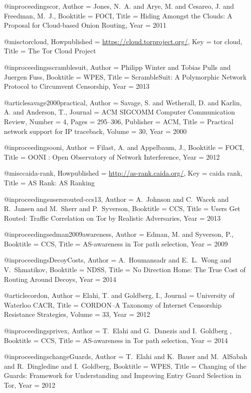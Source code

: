 {{{{{{{{{@inproceedings{cor,
	Author = {Jones, N.~A. and Arye, M. and Cesareo, J. and Freedman, M.~J.},
	Booktitle = {FOCI},
	Title = {{Hiding Amongst the Clouds: A Proposal for Cloud-based Onion Routing}},
	Year = {2011}}

@misc{torcloud,
	Howpublished = {\url{https://cloud.torproject.org/}},
	Key = {tor cloud},
	Title = {{The Tor Cloud Project}}}

@inproceedings{scramblesuit,
	Author = {Philipp Winter and Tobias Pulls and Juergen Fuss},
	Booktitle = {WPES},
	Title = {{ScrambleSuit: A Polymorphic Network Protocol to Circumvent Censorship}},
	Year = 2013}

@article{savage2000practical,
	Author = {Savage, S. and Wetherall, D. and Karlin, A. and Anderson, T.},
	Journal = {ACM SIGCOMM Computer Communication Review},
	Number = {4},
	Pages = {295--306},
	Publisher = {ACM},
	Title = {Practical network support for IP traceback},
	Volume = {30},
	Year = {2000}}

@inproceedings{ooni,
	Author = {Filast, A. and Appelbaum, J.},
	Booktitle = {{FOCI}},
	Title = {{OONI : Open Observatory of Network Interference}},
	Year = {2012}}

@misc{caida-rank,
	Howpublished = {\url{http://as-rank.caida.org/}},
	Key = {caida rank},
	Title = {{AS Rank: AS Ranking}}}

@inproceedings{usersrouted-ccs13,
	Author = {A.~Johnson and C.~Wacek and R.~Jansen and M.~Sherr and P.~Syverson},
	Booktitle = {CCS},
	Title = {{Users Get Routed: Traffic Correlation on Tor by Realistic Adversaries}},
	Year = {2013}}

@inproceedings{edman2009awareness,
	Author = {Edman, M. and Syverson, P.},
	Booktitle = {{CCS}},
	Title = {{AS-awareness in Tor path selection}},
	Year = {2009}}

@inproceedings{DecoyCosts,
	Author = {A.~Houmansadr and E.~L.~Wong and V.~Shmatikov},
	Booktitle = {NDSS},
	Title = {{No Direction Home: The True Cost of Routing Around Decoys}},
	Year = {2014}}

@article{cordon,
	Author = {Elahi, T. and Goldberg, I.},
	Journal = {University of Waterloo CACR},
	Title = {{CORDON--A Taxonomy of Internet Censorship Resistance Strategies}},
	Volume = {33},
	Year = {2012}}

@inproceedings{privex,
	Author = {T.~Elahi and G.~Danezis and I.~Goldberg	},
	Booktitle = {{CCS}},
	Title = {{AS-awareness in Tor path selection}},
	Year = {2014}}

@inproceedings{changeGuards,
	Author = {T.~Elahi and K.~Bauer and M.~AlSabah and R.~Dingledine and I.~Goldberg},
	Booktitle = {{WPES}},
	Title = {{ Changing of the Guards: Framework for Understanding and Improving Entry Guard Selection in Tor}},
	Year = {2012}}

}}}}}}}}}
